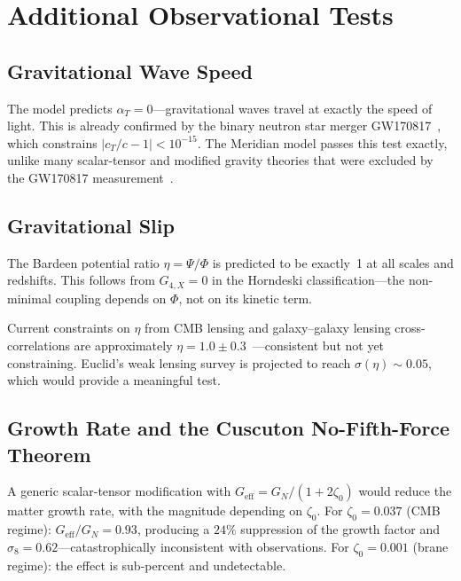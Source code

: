 \section{Additional Observational Tests}
\label{sec:2-additional}

\subsection{Gravitational Wave Speed}
\label{sec:2-GW}

The model predicts $\alpha_T = 0$---gravitational waves travel at exactly the speed of light. This is already confirmed by the binary neutron star merger GW170817~\cite{ch2:GW170817}, which constrains $|c_T/c - 1| < 10^{-15}$. The Meridian model passes this test exactly, unlike many scalar-tensor and modified gravity theories that were excluded by the GW170817 measurement~\cite{ch2:Creminelli2017,ch2:Ezquiaga2017}.

\subsection{Gravitational Slip}
\label{sec:2-slip}

The Bardeen potential ratio $\eta = \Psi/\Phi$ is predicted to be exactly~1 at all scales and redshifts. This follows from $G_{4,X} = 0$ in the Horndeski classification---the non-minimal coupling depends on $\Phi$, not on its kinetic term.

Current constraints on $\eta$ from CMB lensing and galaxy--galaxy lensing cross-correlations are approximately $\eta = 1.0 \pm 0.3$~\cite{ch2:Ruiz2015}---consistent but not yet constraining. Euclid's weak lensing survey is projected to reach $\sigma(\eta) \sim 0.05$, which would provide a meaningful test.

\subsection{Growth Rate and the Cuscuton No-Fifth-Force Theorem}
\label{sec:2-growth}

A generic scalar-tensor modification with $G_\mathrm{eff} = G_N/(1 + 2\zeta_0)$ would reduce the matter growth rate, with the magnitude depending on $\zeta_0$. For $\zeta_0 = 0.037$ (CMB regime): $G_\mathrm{eff}/G_N = 0.93$, producing a $24\%$ suppression of the growth factor and $\sigma_8 = 0.62$---catastrophically inconsistent with observations. For $\zeta_0 = 0.001$ (brane regime): the effect is sub-percent and undetectable.

